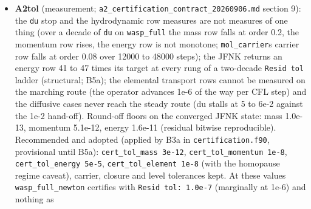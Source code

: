 \documentclass[english,a4paper]{my_memo}
\providecommand{\tightlist}{\setlength{\itemsep}{0pt}\setlength{\parskip}{0pt}}
\begin{document}
\begin{itemize}
  \begin{enumerate}
  \def\labelenumi{\arabic{enumi}.}
  \tightlist
  \item
    Photon conservation on the written states: cell mean 1.000000000 of the
    incident flux, inner face 0.9725 (\texttt{wasp\_full}), 0.9843, 0.9849 (the loss
    sat at the ionization front). Impact: \texttt{wasp\_full} (24000 steps) x(H+)
    8.3e-2 at 1.32 Rp, Mdot +0.74 percent; \texttt{mol\_base\_handoff} Mdot +0.93;
    \texttt{mol\_sec\_ion} +1.01; \texttt{hydrostatic\_column} unchanged. B3b-PE\textquotesingle s two heating
    terms wired into the integrand (its own numbers reproduced cell for cell).
    Advisor: the single-precision \texttt{1.0e-18} cross-section unit literal (33
    sites, 4e-8 relative on every rate) made double. Finding to resolve at the
    gate: \texttt{wasp\_full} on the mid-series tree plateaus at \texttt{du\ =\ 4.2e-3} from
    step 22000 and never reaches 1e-3 (the golden stopped at 16230), identical
    in the item\textquotesingle s before binary, so it belongs to an in-flight change (B3a
    edits \texttt{EXHALE\_main.f90}) or to an earlier landed one; measured after B3a.
  \end{enumerate}
\item
  \textbf{A2tol} (measurement; \texttt{a2\_certification\_contract\_20260906.md} section 9):
  the \texttt{du} stop and the hydrodynamic row measures are not measures of one
  thing (over a decade of \texttt{du} on \texttt{wasp\_full} the mass row falls at order
  0.2, the momentum row rises, the energy row is not monotone; \texttt{mol\_carrier}\textquotesingle s
  carrier row falls at order 0.08 over 12000 to 48000 steps); the JFNK
  returns an energy row 41 to 47 times its target at every rung of a
  two-decade \texttt{Resid\ tol} ladder (structural; B5a); the elemental transport
  rows cannot be measured on the marching route (the operator advances 1e-6
  of the way per CFL step) and the diffusive cases never reach the steady
  route (du stalls at 5 to 6e-2 against the 1e-2 hand-off). Round-off floors
  on the converged JFNK state: mass 1.0e-13, momentum 5.1e-12, energy
  1.6e-11 (residual bitwise reproducible). Recommended and adopted
  (applied by B3a in \texttt{certification.f90}, provisional until B5a):
  \texttt{cert\_tol\_mass\ 3e-12}, \texttt{cert\_tol\_momentum\ 1e-8}, \texttt{cert\_tol\_energy\ 5e-5},
  \texttt{cert\_tol\_element\ 1e-8} (with the homopause regime caveat), carrier,
  closure and level tolerances kept. At these values \texttt{wasp\_full\_newton}
  certifies with \texttt{Resid\ tol:\ 1.0e-7} (marginally at 1e-6) and nothing as

\end{itemize}
\end{document}
